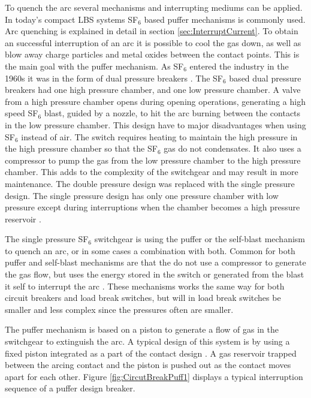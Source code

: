\documentclass[10pt,a4paper]{article}
\begin{document}
To quench the arc several mechanisms and interrupting mediums can be applied. In today's compact LBS systems SF$_6$ based puffer mechanisms is commonly used. Arc quenching is explained in detail in section \ref{sec:InterruptCurrent}. To obtain an successful interruption of an arc it is possible to cool the gas down, as well as blow away charge particles and metal oxides between the contact points. This is the main goal with the puffer mechanism. As SF$_6$ entered the industry in the 1960s it was in the form of dual pressure breakers \cite{bib:HVEbreak}. The SF$_6$ based dual pressure breakers had one high pressure chamber, and one low pressure chamber. A valve from a high pressure chamber opens during opening operations, generating a high speed SF$_6$ blast, guided by a nozzle, to hit the arc burning between the contacts in the low pressure chamber. This design have to major disadvantages when using SF$_6$ instead of air. The switch requires heating to maintain the high pressure in the high pressure chamber so that the SF$_6$ gas do not condensates. It also uses a compressor to pump the gas from the low pressure chamber to the high pressure chamber. This adds to the complexity of the switchgear and may result in more maintenance. The double pressure design was replaced with the single pressure design. The single pressure design has only one pressure chamber with low pressure except during interruptions when the chamber becomes a high pressure reservoir \cite{bib:HVEbreak}.

The single pressure SF$_6$ switchgear is using the puffer or the self-blast mechanism to quench an arc, or in some cases a combination with both. Common for both puffer and self-blast mechanisms are that the do not use a compressor to generate the gas flow, but uses the energy stored in the switch or generated from the blast it self to interrupt the arc \cite{bib:HVEbreak}. These mechanisms works the same way for both circuit breakers and load break switches, but will in load break switches be smaller and less complex since the pressures often are smaller.

The puffer mechanism is based on a piston to generate a flow of gas in the switchgear to extinguish the arc. A typical design of this system is by using a fixed piston integrated as a part of the contact design \cite{bib:HVEbreak}. A gas reservoir trapped between the arcing contact and the piston is pushed out as the contact moves apart for each other. Figure \ref{fig:CircutBreakPuff1} displays a typical interruption sequence of a puffer design breaker.
\end{document}
